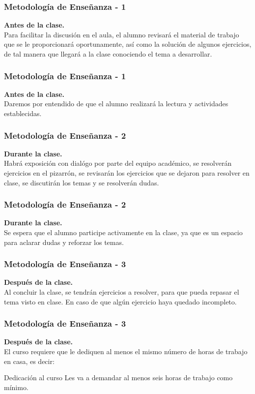 \documentclass[12pt]{beamer}
\begin{document}
\begin{frame}
\frametitle{Metodología de Enseñanza - 1}
\textbf{Antes de la clase.}
\\
\vspace{0.5em}
Para facilitar la discusión en el aula, el alumno revisará el material de trabajo que se le proporcionará oportunamente, así como la solución de algunos ejercicios, de tal manera que llegará a la clase conociendo el tema a desarrollar.
\end{frame}
\begin{frame}
\frametitle{Metodología de Enseñanza - 1}
\textbf{Antes de la clase.}
\\
\vspace{0.5em}
Daremos por entendido de que el alumno realizará la lectura y actividades establecidas.
\end{frame}
\begin{frame} 
\frametitle{Metodología de Enseñanza - 2}
\textbf{Durante la clase.}
\\
\vspace{0.5em}
Habrá exposición con dialógo por parte del equipo académico, se resolverán ejercicios en el pizarrón, se revisarán los ejercicios que se dejaron para resolver en clase, se discutirán los temas y se resolverán dudas.
\end{frame}
\begin{frame} 
\frametitle{Metodología de Enseñanza - 2}
\textbf{Durante la clase.}
\\
\vspace{0.5em}
Se espera que el alumno participe activamente en la clase, ya que es un espacio para aclarar dudas y reforzar los temas.
\end{frame}
\begin{frame}
\frametitle{Metodología de Enseñanza - 3}
\textbf{Después de la clase.}
\\
\vspace{0.5em}
Al concluir la clase, se tendrán ejercicios a resolver, para que pueda repasar el tema visto en clase. En caso de que algún ejercicio haya quedado incompleto.
\end{frame}
\begin{frame}
\frametitle{Metodología de Enseñanza - 3}
\textbf{Después de la clase.}
\\
\medskip
El curso \alert{requiere que le dediquen al menos el mismo número de horas de trabajo en casa}, es decir:
\pause
\begin{exampleblock}{Dedicación al curso}
Les va a demandar al menos seis horas de trabajo como mínimo.
\end{exampleblock}
\end{frame}
\end{document}
